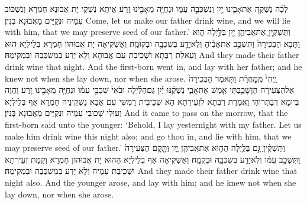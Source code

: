 {לְכָ֨ה נַשְׁקֶ֧ה אֶת\maqqaf אָבִ֛ינוּ יַ֖יִן וְנִשְׁכְּבָ֣ה עִמּ֑וֹ וּנְחַיֶּ֥ה מֵאָבִ֖ינוּ זָֽרַע׃}
{אֵיתַא נַשְׁקֵי יָת אֲבוּנָא חַמְרָא וְנִשְׁכּוֹב עִמֵּיהּ וּנְקַיֵּים מֵאֲבוּנָא בְּנִין׃}
{Come, let us make our father drink wine, and we will lie with him, that we may preserve seed of our father.’}{}
{וַתַּשְׁקֶ֧יןָ אֶת\maqqaf אֲבִיהֶ֛ן יַ֖יִן בַּלַּ֣יְלָה ה֑וּא וַתָּבֹ֤א הַבְּכִירָה֙ וַתִּשְׁכַּ֣ב אֶת\maqqaf אָבִ֔יהָ וְלֹֽא\maqqaf יָדַ֥ע בְּשִׁכְבָ֖הּ וּבְקוּׄמָֽהּ׃}
{וְאַשְׁקִיאָה יָת אֲבוּהוֹן חַמְרָא בְּלֵילְיָא הוּא וְעַאלַת רַבְּתָא וּשְׁכֵיבַת עִם אֲבוּהָא וְלָא יְדַע בְּמִשְׁכְּבַהּ וּבִמְקִימַהּ׃}
{And they made their father drink wine that night. And the first-born went in, and lay with her father; and he knew not when she lay down, nor when she arose.}{}
{וַֽיְהִי֙ מִֽמׇּחֳרָ֔ת וַתֹּ֤אמֶר הַבְּכִירָה֙ אֶל\maqqaf הַצְּעִירָ֔ה הֵן\maqqaf שָׁכַ֥בְתִּי אֶ֖מֶשׁ אֶת\maqqaf אָבִ֑י נַשְׁקֶ֨נּוּ יַ֜יִן גַּם\maqqaf הַלַּ֗יְלָה וּבֹ֙אִי֙ שִׁכְבִ֣י עִמּ֔וֹ וּנְחַיֶּ֥ה מֵאָבִ֖ינוּ זָֽרַע׃}
{וַהֲוָה בְּיוֹמָא דְּבָתְרוֹהִי וַאֲמַרַת רַבְּתָא לִזְעֵירְתָא הָא שְׁכֵיבִית רַמְשִׁי עִם אַבָּא נַשְׁקֵינֵיהּ חַמְרָא אַף בְּלֵילְיָא וְעוּלִי שְׁכוּבִי עִמֵּיהּ וּנְקַיֵּים מַאֲבוּנָא בְּנִין׃}
{And it came to pass on the morrow, that the first-born said unto the younger: ‘Behold, I lay yesternight with my father. Let us make him drink wine this night also; and go thou in, and lie with him, that we may preserve seed of our father.’}{}
{וַתַּשְׁקֶ֜יןָ גַּ֣ם בַּלַּ֧יְלָה הַה֛וּא אֶת\maqqaf אֲבִיהֶ֖ן יָ֑יִן וַתָּ֤קׇם הַצְּעִירָה֙ וַתִּשְׁכַּ֣ב עִמּ֔וֹ וְלֹֽא\maqqaf יָדַ֥ע בְּשִׁכְבָ֖הּ וּבְקֻמָֽהּ׃}
{וְאַשְׁקִיאָה אַף בְּלֵילְיָא הַהוּא יָת אֲבוּהוֹן חַמְרָא וְקַמַת זְעֵירְתָא וּשְׁכֵיבַת עִמֵּיהּ וְלָא יְדַע בְּמִשְׁכְּבַהּ וּבִמְקִימַהּ׃}
{And they made their father drink wine that night also. And the younger arose, and lay with him; and he knew not when she lay down, nor when she arose.}{}
